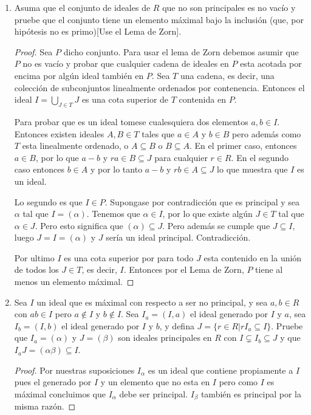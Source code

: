 \documentclass[letter,twoside,12pt]{article}
\begin{document}
\begin{enumerate}[label=\textbf{(\alph*)}]
\item Asuma que el conjunto de ideales de $ R $ que no son principales es no vacío y pruebe que el conjunto tiene un elemento máximal bajo la inclusión (que, por hipótesis no es primo)[Use el Lema de Zorn].

\begin{proof}
Sea $ P $ dicho conjunto. Para usar el lema de Zorn debemos asumir que $ P $ no es vacío y probar que cualquier cadena de ideales en $P$ esta acotada por encima por algún ideal también en $ P $. Sea $ T $ una cadena, es decir, una colección de subconjuntos linealmente ordenados por contenencia. Entonces el ideal $I= \bigcup_{J \in T} J$ es una cota superior de $T$ contenida en $P$.

Para probar que es un ideal tomese cualesquiera dos elementos $ a,b \in I $. Entonces existen ideales $ A, B \in T $ tales que $a \in A$ y $b \in B$ pero además como $T$ esta linealmente ordenado, o $ A \subseteq B $ o $ B \subseteq A $. En el primer caso, entonces $ a \in B$, por lo que $ a-b $ y $ra \in B \subseteq J$ para cualquier $ r \in R $. En el segundo caso entonces $ b \in A $ y por lo tanto $a-b$ y $rb \in A \subseteq J$ lo que muestra que $I$ es un ideal.

Lo segundo es que $I \in P$. Supongase por contradicción que es principal y sea $ \alpha $ tal que $ I =(\alpha) $. Tenemos que $ \alpha \in I $, por lo que existe algún $ J \in T $ tal que $ \alpha \in J $. Pero esto significa que $(\alpha) \subseteq J$. Pero además se cumple que $J \subseteq I$, luego $ J = I = (\alpha) $ y $J$ sería un ideal principal. Contradicción.

Por ultimo $ I $ es una cota superior por para todo $ J $ esta contenido en la unión de todos los $ J  \in T$, es decir, $I$. Entonces por el Lema de Zorn, $ P $ tiene al menos un elemento máximal. 
\end{proof}

\item Sea $ I $ un ideal que es máximal con respecto a ser no principal, y sea $ a,b \in R$ con $ ab \in I $ pero $ a \not \in I $ y $ b \not \in I $. Sea $ I_a =(I,a) $ el ideal generado por $ I $ y $ a $, sea $ I_b = (I,b)$ el ideal generado por $ I $ y $ b $, y defina $ J = \{r \in R | rI_a \subseteq I \} $. Pruebe que $ I_a = (\alpha) $ y $ J = (\beta) $ son ideales principales en $ R $ con $ I \subsetneq I_b \subseteq J$ y que $ I_aJ= (\alpha\beta) \subseteq I$.
\begin{proof}
Por nuestras suposiciones $ I_\alpha $ es un ideal que contiene propiamente a $ I $ pues el generado por $I$ y un elemento que no esta en $I$ pero como $ I $ es máximal concluimos que $ I_\alpha $ debe ser principal. $ I_\beta $ también es principal por la misma razón. 


\end{proof}
\end{enumerate}
\end{document}
